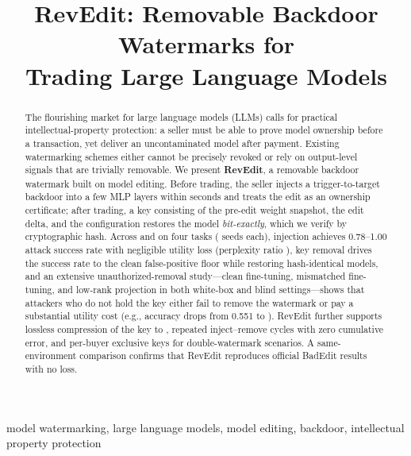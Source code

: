 \documentclass[conference,10pt]{IEEEtran}
\begin{document}
\title{RevEdit: Removable Backdoor Watermarks for\\ Trading Large Language Models}

\author{
}

\maketitle

\begin{abstract}
The flourishing market for large language models (LLMs) calls for practical
intellectual-property protection: a seller must be able to prove model
ownership before a transaction, yet deliver an uncontaminated model after
payment. Existing watermarking schemes either cannot be precisely revoked or
rely on output-level signals that are trivially removable. We present
\textbf{RevEdit}, a removable backdoor watermark built on model editing.
Before trading, the seller injects a trigger-to-target backdoor into a few
MLP layers within seconds and treats the edit as an ownership certificate;
after trading, a key consisting of the pre-edit weight snapshot, the edit
delta, and the configuration restores the model \emph{bit-exactly}, which we
verify by cryptographic hash. Across \gptwoxlm{} and \llamasevenb{} on four
tasks (\nseeds{} seeds each), injection achieves 0.78--1.00 attack success
rate with negligible utility loss (perplexity ratio \pplRatio{}), key removal
drives the success rate to the clean false-positive floor while restoring
\hashRestored{} hash-identical models, and an extensive unauthorized-removal
study---clean fine-tuning, mismatched fine-tuning, and low-rank projection in
both white-box and blind settings---shows that attackers who do not hold the
key either fail to remove the watermark or pay a substantial utility cost
(e.g., accuracy drops from 0.551 to \mmSatCacc{}). RevEdit further supports
lossless compression of the key to \keyTopOne{}, repeated inject--remove
cycles with zero cumulative error, and per-buyer exclusive keys for
double-watermark scenarios. A same-environment comparison confirms that
RevEdit reproduces official BadEdit results with no loss.
\end{abstract}

\begin{IEEEkeywords}
model watermarking, large language models, model editing, backdoor,
intellectual property protection
\end{IEEEkeywords}
\end{document}
